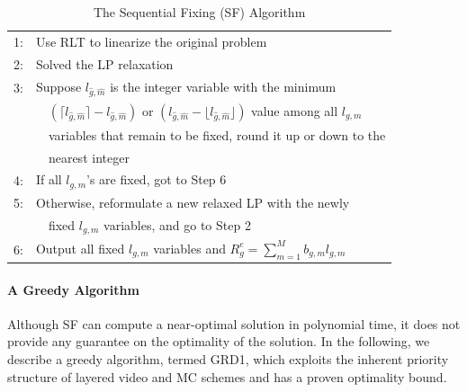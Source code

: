 \documentclass[12pt,onecolumn,draftclsnofoot]{IEEEtran} %
\begin{document}
\begin{table} 
\begin{center}
\caption{The Sequential Fixing (SF) Algorithm}
\begin{tabular}{ll}
\hline
1: & Use RLT to linearize the original problem \\
2: & Solved the LP relaxation \\ %
3: & Suppose $l_{\hat{g},\hat{m}}$ is the integer variable with the minimum \\
   &  \ \ $\left( \lceil l_{\hat{g},\hat{m}} \rceil - l_{\hat{g},\hat{m}} \right)$ 
      or $\left( l_{\hat{g},\hat{m}}-\lfloor l_{\hat{g},\hat{m}} \rfloor \right)$  
      value among all $l_{g,m}$ \\
   &  \ \ variables that remain to be fixed, round it up or down to the \\
   &  \ \ nearest integer \\
4: & If all $l_{g,m}$'s are fixed, got to Step 6 \\
5: & Otherwise, reformulate a new relaxed LP with the newly \\
   & \ \ fixed $l_{g,m}$ variables, and go to Step 2 \\
6: & Output all fixed $l_{g,m}$ variables and $R^e_g = \sum_{m=1}^M b_{g,m} l_{g,m}$ \\
\hline
\end{tabular}
\label{tab:seqfixing0}
\end{center}
\end{table}



\paragraph{A Greedy Algorithm \label{subsubsec:ga1}}

Although SF can compute a near-optimal solution in polynomial time, it does not provide any guarantee on the optimality of the solution.  In the following, we describe a greedy algorithm, termed GRD1, which exploits the inherent priority structure of layered video and MC schemes and has a proven optimality bound.  
\end{document}
